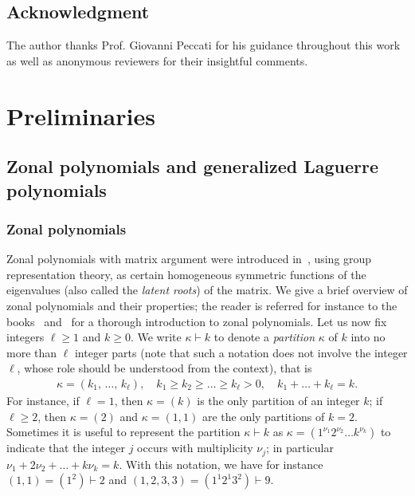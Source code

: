 \documentclass[10pt]{amsart}
\theoremstyle{definition}\newtheorem{defi}[theo]{Definition}\newtheorem{rema}[theo]{Remark}\newtheorem{exam}[theo]{Example}\newtheorem{exem}[theo]{Example}\newtheorem{nota}[theo]{Notation}
\begin{document}
\subsection*{Acknowledgment}
The author thanks Prof. Giovanni Peccati for his guidance throughout this work as well as anonymous reviewers for their insightful comments. 



\section{Preliminaries}\label{Prel}
\subsection{Zonal polynomials and generalized Laguerre polynomials}\label{SecZP}
\subsubsection*{Zonal polynomials}
Zonal polynomials with matrix argument were introduced in~\cite{J61}, using group representation theory, as certain homogeneous symmetric functions of the eigenvalues (also called the \emph{latent roots}) of the matrix. We give a brief overview of zonal polynomials and their properties; the reader is referred for instance to the books~\cite{BFZP} and~\cite{Ch2012} for a thorough introduction to zonal polynomials. Let us now fix integers $\ell\geq 1$ and $k\geq 0$. We write $\kappa \vdash k$ to denote a \emph{partition} $\kappa$ of $k$ into no more than $\ell$ integer parts (note that such a notation does not involve the integer $\ell$, whose role should be understood from the context), that is
\begin{gather*}
\kappa=(k_1,\,\ldots,\,k_{\ell}), \quad k_1\geq k_2\geq \ldots \geq k_{\ell}> 0, \quad k_1+\ldots+k_{\ell}=k.
\end{gather*}
For instance, if $\ell=1$, then $\kappa=(k)$ is the only partition of an integer $k$; if $\ell\geq 2$, then $\kappa = (2)$ and $\kappa=(1,1)$ are the only partitions of $k=2$. Sometimes it is useful to represent the partition $\kappa \vdash k$ as $\kappa=(1^{\nu_1} 2^{\nu_2} \ldots k^{\nu_k})$ to indicate that the integer $j$ occurs with multiplicity $\nu_j$; in particular $\nu_1+2\nu_2+\ldots+k\nu_k=k$. With this notation, we have for instance $(1,1)=(1^2) \vdash 2$ and $ (1,2,3,3)=(1^{1} 2^1 3^2) \vdash 9$.
\end{document}
